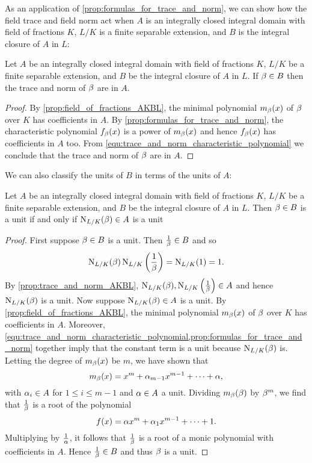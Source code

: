     As an application of \cref{prop:formulas_for_trace_and_norm}, we can show how the field trace and field norm act when $A$ is an integrally closed integral domain with field of fractions $K$, $L/K$ is a finite separable extension, and $B$ is the integral closure of $A$ in $L$:

    \begin{proposition}\label{prop:trace_and_norm_AKBL}
      Let $A$ be an integrally closed integral domain with field of fractions $K$, $L/K$ be a finite separable extension, and $B$ be the integral closure of $A$ in $L$. If $\beta \in B$ then the trace and norm of $\beta$ are in $A$.
    \end{proposition}
    \begin{proof}
      By \cref{prop:field_of_fractions_AKBL}, the minimal polynomial $m_{\beta}(x)$ of $\beta$ over $K$ has coefficients in $A$. By \cref{prop:formulas_for_trace_and_norm}, the characteristic polynomial $f_{\beta}(x)$ is a power of $m_{\beta}(x)$ and hence $f_{\beta}(x)$ has coefficients in $A$ too. From \cref{equ:trace_and_norm_characteristic_polynomial} we conclude that the trace and norm of $\beta$ are in $A$.
    \end{proof}

    We can also classify the units of $B$ in terms of the units of $A$:

    \begin{proposition}\label{prop:unit_if_and_only_if_AKBL}
      Let $A$ be an integrally closed integral domain with field of fractions $K$, $L/K$ be a finite separable extension, and $B$ be the integral closure of $A$ in $L$. Then $\beta \in B$ is a unit if and only if $\operatorname{\mathrm{N}}_{L/K}(\beta) \in A$ is a unit
    \end{proposition}
    \begin{proof}
      First suppose $\beta \in B$ is a unit. Then $\frac{1}{\beta} \in B$ and so
      \[
        \operatorname{\mathrm{N}}_{L/K}(\beta)\operatorname{\mathrm{N}}_{L/K}\left(\frac{1}{\beta}\right) = \operatorname{\mathrm{N}}_{L/K}(1) = 1.
      \]
      By \cref{prop:trace_and_norm_AKBL}, $\operatorname{\mathrm{N}}_{L/K}(\beta),\operatorname{\mathrm{N}}_{L/K}\left(\frac{1}{\beta}\right) \in A$ and hence $\operatorname{\mathrm{N}}_{L/K}(\beta)$ is a unit. Now suppose $\operatorname{\mathrm{N}}_{L/K}(\beta) \in A$ is a unit. By \cref{prop:field_of_fractions_AKBL}, the minimal polynomial $m_{\beta}(x)$ of $\beta$ over $K$ has coefficients in $A$. Moreover, \cref{equ:trace_and_norm_characteristic_polynomial,prop:formulas_for_trace_and_norm} together imply that the constant term is a unit because $\operatorname{\mathrm{N}}_{L/K}(\beta)$ is. Letting the degree of $m_{\beta}(x)$ be $m$, we have shown that
      \[
        m_{\beta}(x) = x^{m}+\alpha_{m-1}x^{m-1}+\cdots+\alpha,
      \]
      with $\alpha_{i} \in A$ for $1 \le i \le m-1$ and $\alpha \in A$ a unit. Dividing $m_{\beta}(\beta)$ by $\beta^{m}$, we find that $\frac{1}{\beta}$ is a root of the polynomial
      \[
        f(x) = \alpha x^{m}+\alpha_{1}x^{m-1}+\cdots+1.
      \]
      Multiplying by $\frac{1}{\alpha}$, it follows that $\frac{1}{\beta}$ is a root of a monic polynomial with coefficients in $A$. Hence $\frac{1}{\beta} \in B$ and thus $\beta$ is a unit.
    \end{proof}

